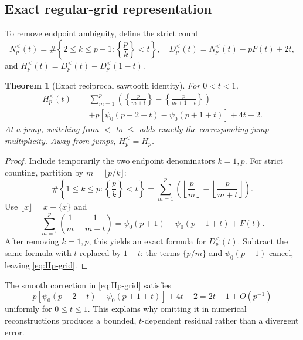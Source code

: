 \documentclass[11pt]{amsart}
\numberwithin{equation}{section}
\newtheorem{theorem}{Theorem}[section]
\theoremstyle{definition}
\theoremstyle{remark}
\begin{document}
\subsection{Exact regular-grid representation}

To remove endpoint ambiguity, define the strict count
\begin{equation}\label{eq:N-strict}
 N_p^{<}(t)=\#\left\{2\le k\le p-1:\left\{\frac pk\right\}<t\right\},
 \quad
 D_p^{<}(t)=N_p^{<}(t)-pF(t)+2t,
\end{equation}
and \(H_p^{<}(t)=D_p^{<}(t)-D_p^{<}(1-t)\).

\begin{theorem}[Exact reciprocal sawtooth identity]\label{thm:Hp-grid}
For \(0<t<1\),
\begin{equation}\label{eq:Hp-grid}
\begin{aligned}
 H_p^{<}(t)
={}&\sum_{m=1}^{p}
 \left(\left\{\frac{p}{m+t}\right\}
       -\left\{\frac{p}{m+1-t}\right\}\right)\\
&+p\left[\psi_0(p+2-t)-\psi_0(p+1+t)\right]+4t-2.
\end{aligned}
\end{equation}
At a jump, switching from \(<\) to \(\le\) adds exactly the corresponding
jump multiplicity.  Away from jumps, \(H_p^{<}=H_p\).
\end{theorem}

\begin{proof}
Include temporarily the two endpoint denominators \(k=1,p\).  For strict
counting, partition by \(m=\lfloor p/k\rfloor\):
\[
 \#\left\{1\le k\le p:\left\{\frac pk\right\}<t\right\}
 =\sum_{m=1}^{p}
 \left(\left\lfloor\frac pm\right\rfloor
       -\left\lfloor\frac{p}{m+t}\right\rfloor\right).
\]
Use \(\lfloor x\rfloor=x-\{x\}\) and
\[
 \sum_{m=1}^{p}\left(\frac1m-\frac1{m+t}\right)
 =\psi_0(p+1)-\psi_0(p+1+t)+F(t).
\]
After removing \(k=1,p\), this yields an exact formula for
\(D_p^{<}(t)\).  Subtract the same formula with \(t\) replaced by \(1-t\):
the terms \(\{p/m\}\) and \(\psi_0(p+1)\) cancel, leaving
\eqref{eq:Hp-grid}.
\end{proof}

The smooth correction in \eqref{eq:Hp-grid} satisfies
\begin{equation}\label{eq:Hp-grid-smooth-asymp}
 p\left[\psi_0(p+2-t)-\psi_0(p+1+t)\right]+4t-2
 =2t-1+O(p^{-1})
\end{equation}
uniformly for \(0\le t\le1\).  This explains why omitting it in numerical
reconstructions produces a bounded, \(t\)-dependent residual rather than a
divergent error.
\end{document}
